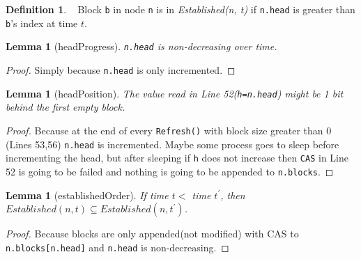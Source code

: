 \documentclass[10pt]{article}
\newtheorem{lemma}[theorem]{Lemma}
\theoremstyle{definition}
\newtheorem{definition}[theorem]{Definition}
\begin{document}
\begin{definition}
  Block \texttt{b} in node \texttt{n} is in \emph{Established(n, t)} if \texttt{n.head} is greater than \texttt{b}'s index at time $t$.
\end{definition}

\begin{lemma}[headProgress] \label{lem::headProgress}
\texttt{n.head} is non-decreasing over time.
\end{lemma}
\begin{proof}
  Simply because \texttt{n.head} is only incremented.
\end{proof}


\begin{lemma}[headPosition] \label{lem::headPosition} The value read in Line 52(\texttt{h=n.head}) might be 1 bit behind the first empty block.
\end{lemma}
\begin{proof}
 Because at the end of every \texttt{Refresh()} with block size greater than 0 (Lines 53,56) \texttt{n.head} is incremented. Maybe some process goes to sleep before incrementing the head, but after sleeping if \texttt{h} does not increase then \texttt{CAS} in Line 52 is going to be failed and nothing is going to be appended to \texttt{n.blocks}.
\end{proof}


\begin{lemma}[establishedOrder]\label{lem::establishedOrder}
  If  time $t<$ time $t^\prime$, then $Established(n, t)\subseteq Established(n, t^\prime)$.
\end{lemma}
\begin{proof}
Because blocks are only appended(not modified) with CAS to \texttt{n.blocks[n.head]} and \texttt{n.head} is non-decreasing.
\end{proof}
\end{document}
